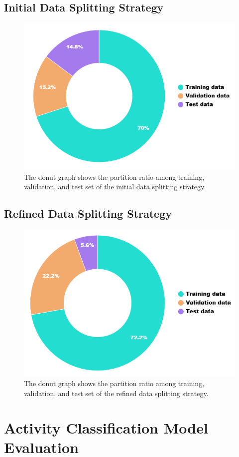 \documentclass{l4proj}
\begin{document}
\begin{appendices}
\subsection{Initial Data Splitting Strategy}
\begin{figure}[h]
    \centering
    \includegraphics[width=0.4\linewidth]{images/data-splitting-method1.png}
    \caption{The donut graph shows the partition ratio among training, validation, and test set of the initial data splitting strategy.}
    \label{fig:data-splitting-method1}
\end{figure}

\subsection{Refined Data Splitting Strategy}
\begin{figure}[h]
    \centering
    \includegraphics[width=0.4\linewidth]{images/data-splitting-method2.png}
    \caption{The donut graph shows the partition ratio among training, validation, and test set of the refined data splitting strategy.}
    \label{fig:data-splitting-method2}
\end{figure}

\newpage

\section{Activity Classification Model Evaluation}

\end{appendices}
\end{document}
